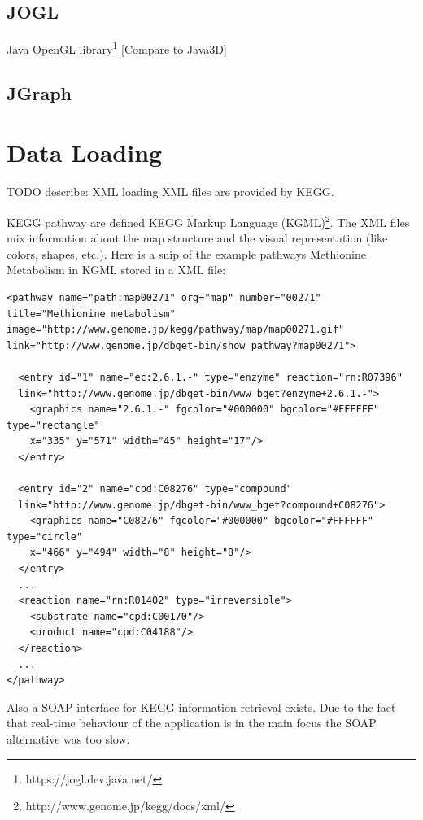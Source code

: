 \subsection{JOGL}

Java OpenGL library\footnote{https://jogl.dev.java.net/}
[Compare to Java3D]

\subsection{JGraph}

\section{Data Loading}

TODO describe:
XML loading
XML files are provided by KEGG.


KEGG pathway are defined KEGG Markup Language (KGML)\footnote{http://www.genome.jp/kegg/docs/xml/}.
The XML files mix information about the map structure and the visual representation (like colors, shapes, etc.).
Here is a snip of the example pathways Methionine Metabolism in KGML stored in a XML file:

\begin{verbatim}
<pathway name="path:map00271" org="map" number="00271" 
title="Methionine metabolism" 
image="http://www.genome.jp/kegg/pathway/map/map00271.gif" 
link="http://www.genome.jp/dbget-bin/show_pathway?map00271">

  <entry id="1" name="ec:2.6.1.-" type="enzyme" reaction="rn:R07396"
  link="http://www.genome.jp/dbget-bin/www_bget?enzyme+2.6.1.-">
    <graphics name="2.6.1.-" fgcolor="#000000" bgcolor="#FFFFFF" type="rectangle" 
    x="335" y="571" width="45" height="17"/>
  </entry>

  <entry id="2" name="cpd:C08276" type="compound" 
  link="http://www.genome.jp/dbget-bin/www_bget?compound+C08276">
    <graphics name="C08276" fgcolor="#000000" bgcolor="#FFFFFF" type="circle" 
    x="466" y="494" width="8" height="8"/>
  </entry>
  ...
  <reaction name="rn:R01402" type="irreversible">
    <substrate name="cpd:C00170"/>
    <product name="cpd:C04188"/>
  </reaction>
  ...
</pathway>
\end{verbatim}

Also a SOAP interface for KEGG information retrieval exists. Due to the fact that real-time behaviour of the application is in the main focus the SOAP alternative was too slow.

